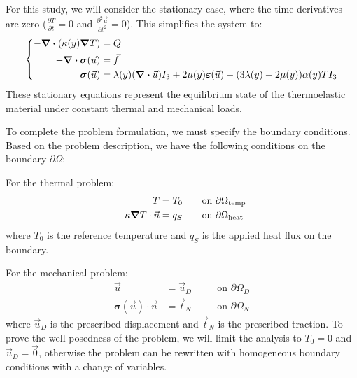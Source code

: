 \documentclass[a4paper,12pt,twoside]{report}
\begin{document}
For this study, we will consider the stationary case, where the time derivatives are zero ($\frac{\partial T}{\partial t} = 0$ and $\frac{\partial^2 \vec u}{\partial t^2} = 0$). This simplifies the system to:
\begin{equation*}
	\left\{
	\begin{aligned}
		- \div (\kappa(y) \grad T) &= Q \\
		- \div \boldsymbol{\sigma}(\vec u) &= \vec f \\
		\boldsymbol{\sigma}(\vec u) &= \lambda(y) (\div \vec u) I_3 + 2\mu(y) \boldsymbol{\varepsilon}(\vec u) - (3\lambda(y) + 2\mu(y)) \alpha(y) T I_3 
	\end{aligned}
	\right.
\end{equation*}
These stationary equations represent the equilibrium state of the thermoelastic material under constant thermal and mechanical loads.

To complete the problem formulation, we must specify the boundary conditions. Based on the problem description, we have the following conditions on the boundary $\partial\Omega$:

For the thermal problem:
\begin{align}
    T &= T_0 \quad &&\text{on } \partial\Omega_{\text{temp}} \label{eq:bc_temp_dirichlet_thermoelastic} \\
    - \kappa \grad T \cdot \vec n &= q_S \quad &&\text{on } \partial\Omega_{\text{heat}} \label{eq:bc_temp_neumann_thermoelastic}
\end{align}
where $T_0$ is the reference temperature and $q_S$ is the applied heat flux on the boundary.

For the mechanical problem:
\begin{align}
    \vec u &= \vec u_D \quad &&\text{on } \partial\Omega_D \label{eq:bc_disp_dirichlet_thermoelastic} \\
    \boldsymbol{\sigma}(\vec u) \cdot \vec n &= \vec t_N \quad &&\text{on } \partial\Omega_N \label{eq:bc_disp_neumann_thermoelastic}
\end{align}
where $\vec u_D$ is the prescribed displacement and $\vec t_N$ is the prescribed traction. 
To prove the well-posedness of the problem, we will limit the analysis to $T_0 = 0$ and $\vec u_D = \vec 0$, otherwise the problem can be rewritten with homogeneous boundary conditions with a change of variables.
 
\end{document}
